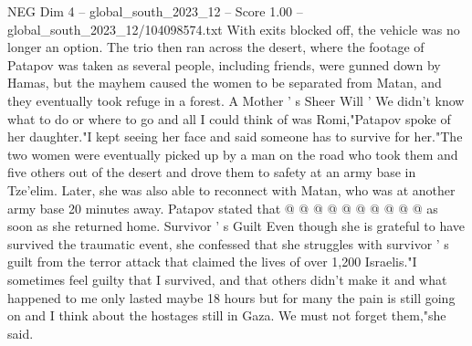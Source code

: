 \begin{textsample}{NEG Dim 4 – global\_south\_2023\_12 – Score 1.00 – global\_south\_2023\_12/104098574.txt}
With exits blocked off, the vehicle was no longer an option.
The trio then ran across the desert, where the footage of Patapov was taken as several people, including friends, were gunned down by Hamas, but the mayhem caused the women to be separated from Matan, and they eventually took refuge in a forest.
A Mother ' s Sheer Will ' We didn't know what to do or where to go and all I could think of was Romi,"Patapov spoke of her daughter."I kept seeing her face and said someone has to survive for her."The two women were eventually picked up by a man on the road who took them and five others out of the desert and drove them to safety at an army base in Tze'elim.
Later, she was also able to reconnect with Matan, who was at another army base 20 minutes away.
Patapov stated that @ @ @ @ @ @ @ @ @ @ as soon as she returned home.
Survivor ' s Guilt Even though she is grateful to have survived the traumatic event, she confessed that she struggles with survivor ' s guilt from the terror attack that claimed the lives of over 1,200 Israelis."I sometimes feel guilty that I survived, and that others didn't make it and what happened to me only lasted maybe 18 hours but for many the pain is still going on and I think about the hostages still in Gaza.
We must not forget them,"she said.

\end{textsample}
